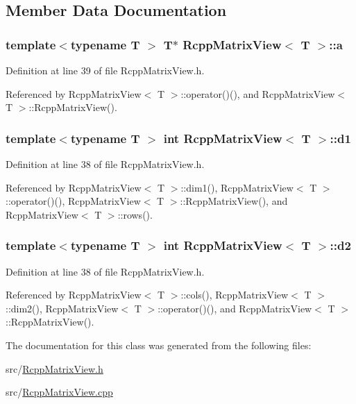 \subsection{Member Data Documentation}
\hypertarget{classRcppMatrixView_ad38481118f63a84a132e8f2265de5bdd}{
\subsubsection[{a}]{\setlength{\rightskip}{0pt plus 5cm}template$<$typename T $>$ T$\ast$ {\bf RcppMatrixView}$<$ T $>$::{\bf a}}}
\label{classRcppMatrixView_ad38481118f63a84a132e8f2265de5bdd}


Definition at line 39 of file RcppMatrixView.h.

Referenced by RcppMatrixView$<$ T $>$::operator()(), and RcppMatrixView$<$ T $>$::RcppMatrixView().\hypertarget{classRcppMatrixView_ad492401691ef709f6d2ef7dc1dcc2134}{
\subsubsection[{d1}]{\setlength{\rightskip}{0pt plus 5cm}template$<$typename T $>$ int {\bf RcppMatrixView}$<$ T $>$::{\bf d1}}}
\label{classRcppMatrixView_ad492401691ef709f6d2ef7dc1dcc2134}


Definition at line 38 of file RcppMatrixView.h.

Referenced by RcppMatrixView$<$ T $>$::dim1(), RcppMatrixView$<$ T $>$::operator()(), RcppMatrixView$<$ T $>$::RcppMatrixView(), and RcppMatrixView$<$ T $>$::rows().\hypertarget{classRcppMatrixView_a37b5f5806957eeb0b688d6a157a2a264}{
\subsubsection[{d2}]{\setlength{\rightskip}{0pt plus 5cm}template$<$typename T $>$ int {\bf RcppMatrixView}$<$ T $>$::{\bf d2}}}
\label{classRcppMatrixView_a37b5f5806957eeb0b688d6a157a2a264}


Definition at line 38 of file RcppMatrixView.h.

Referenced by RcppMatrixView$<$ T $>$::cols(), RcppMatrixView$<$ T $>$::dim2(), RcppMatrixView$<$ T $>$::operator()(), and RcppMatrixView$<$ T $>$::RcppMatrixView().

The documentation for this class was generated from the following files:\begin{DoxyCompactItemize}
\item 
src/\hyperlink{RcppMatrixView_8h}{RcppMatrixView.h}\item 
src/\hyperlink{RcppMatrixView_8cpp}{RcppMatrixView.cpp}\end{DoxyCompactItemize}

